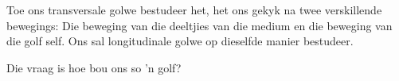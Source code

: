 \label{m38782*id292159}
  Toe ons transversale golwe bestudeer het, het ons gekyk na twee verskillende bewegings: Die beweging van die deeltjies van die medium en die beweging van die golf self. Ons sal longitudinale golwe op dieselfde manier bestudeer.\par 
      \label{m38782*id292164}Die vraag is hoe bou ons so  'n golf?\par 

